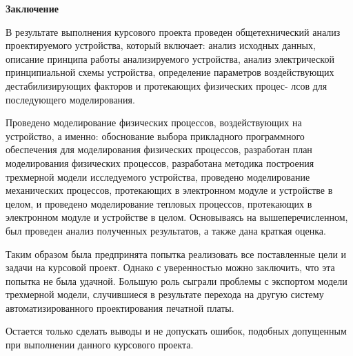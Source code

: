 \begin{center}
\textbf{Заключение}
\end{center}

В результате выполнения курсового проекта проведен общетехнический
анализ проектируемого устройства, который включает: анализ исходных данных, описание принципа работы анализируемого устройства, анализ электрической принципиальной схемы устройства, определение параметров воздействующих дестабилизирующих факторов и протекающих физических процес-
лсов для последующего моделирования.

Проведено моделирование физических процессов, воздействующих на
устройство, а именно: обоснование выбора прикладного программного обеспечения для моделирования физических процессов, разработан план моделирования физических процессов, разработана методика построения трехмерной модели исследуемого устройства, проведено моделирование механических
процессов, протекающих в электронном модуле и устройстве в целом, и проведено моделирование тепловых процессов, протекающих в электронном модуле и устройстве в целом.
Основываясь на вышеперечисленном, был проведен анализ полученных
результатов, а также дана краткая оценка.

Таким образом была предпринята попытка реализовать все поставленные цели и задачи на курсовой проект. Однако с уверенностью можно заключить, что эта попытка не была удачной. Большую роль сыграли проблемы с экспортом модели трехмерной модели, случившиеся в результате перехода на другую систему автоматизированного проектирования печатной платы.

Остается только сделать выводы и не допускать ошибок, подобных допущенным при выполнении данного курсового проекта.
  \newpage



\renewcommand{\refname}{\textbf{Cписок использованных источников}}
\printbibliography
